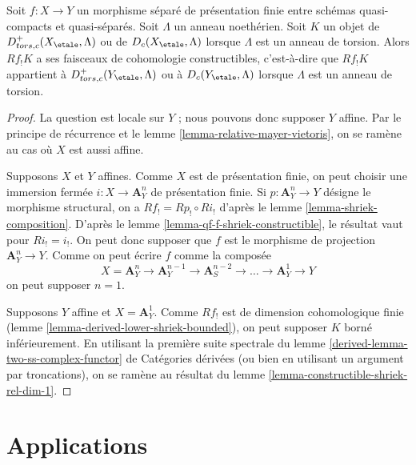 \begin{theorem}
\label{theorem-constructible-shriek}
Soit $f : X \to Y$ un morphisme séparé de présentation finie entre
schémas quasi-compacts et quasi-séparés. Soit $\Lambda$ un anneau
noethérien. Soit $K$ un objet de $D^+_{tors, c}(X_\etale, \Lambda)$
ou de $D_c(X_\etale, \Lambda)$ lorsque $\Lambda$ est un anneau de torsion.
Alors $Rf_!K$ a ses faisceaux de cohomologie constructibles, c'est-à-dire que
$Rf_!K$ appartient à $D^+_{tors, c}(Y_\etale, \Lambda)$
ou à $D_c(Y_\etale, \Lambda)$ lorsque $\Lambda$ est un anneau de torsion.
\end{theorem}

\begin{proof}
La question est locale sur $Y$ ; nous pouvons donc supposer $Y$ affine.
Par le principe de récurrence et le lemme \ref{lemma-relative-mayer-vietoris},
on se ramène au cas où $X$ est aussi affine.

\medskip\noindent
Supposons $X$ et $Y$ affines. Comme $X$ est de présentation finie,
on peut choisir une immersion fermée $i : X \to \mathbf{A}^n_Y$
de présentation finie. Si $p : \mathbf{A}^n_Y \to Y$ désigne
le morphisme structural, on a $Rf_! = Rp_! \circ Ri_!$
d'après le lemme \ref{lemma-shriek-composition}. D'après le
lemme \ref{lemma-qf-f-shriek-constructible},
le résultat vaut pour $Ri_! = i_!$. On peut donc supposer que $f$
est le morphisme de projection $\mathbf{A}^n_Y \to Y$.
Comme on peut écrire $f$ comme la composée
$$
X = \mathbf{A}^n_Y \to \mathbf{A}^{n - 1}_Y \to
\mathbf{A}^{n - 2}_S \to \ldots \to
\mathbf{A}^1_Y \to Y
$$
on peut supposer $n = 1$.

\medskip\noindent
Supposons $Y$ affine et $X = \mathbf{A}^1_Y$. Comme $Rf_!$ est de
dimension cohomologique finie
(lemme \ref{lemma-derived-lower-shriek-bounded}),
on peut supposer $K$ borné inférieurement. En utilisant la première suite spectrale du
lemme \ref{derived-lemma-two-ss-complex-functor} de Catégories dérivées
(ou bien en utilisant un argument par troncations),
on se ramène au résultat du
lemme \ref{lemma-constructible-shriek-rel-dim-1}.
\end{proof}








\section{Applications}
\label{section-applications}

